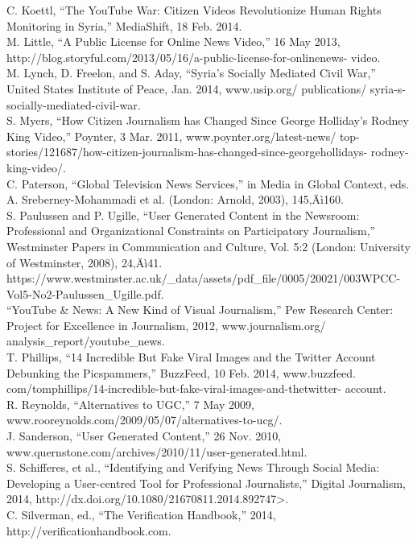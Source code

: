 C. Koettl, ``The YouTube War: Citizen Videos Revolutionize Human Rights
Monitoring in Syria,'' MediaShift, 18 Feb. 2014.\\
M. Little, ``A Public License for Online News Video,'' 16 May 2013,
http://blog.storyful.com/2013/05/16/a-public-license-for-onlinenews-
video.\\
M. Lynch, D. Freelon, and S. Aday, ``Syria's Socially Mediated Civil War,''
United States Institute of Peace, Jan. 2014, www.usip.org/ publications/
syria-s-socially-mediated-civil-war.\\
S. Myers, ``How Citizen Journalism has Changed Since George Holliday's
Rodney King Video,'' Poynter, 3 Mar. 2011, www.poynter.org/latest-news/
top-stories/121687/how-citizen-journalism-has-changed-since-georgehollidays-
rodney-king-video/.\\
C. Paterson, ``Global Television News Services,'' in Media in Global
Context, eds. A. Sreberney-Mohammadi et al. (London: Arnold, 2003),
145‚Äì160.\\
S. Paulussen and P. Ugille, ``User Generated Content in the Newsroom:
Professional and Organizational Constraints on Participatory Journalism,''
Westminster Papers in Communication and Culture, Vol. 5:2 (London:
University of Westminster, 2008), 24‚Äì41. https://www.westminster.ac.uk/_data/assets/pdf_file/0005/20021/003WPCC-Vol5-No2-Paulussen_Ugille.pdf.\\
``YouTube & News: A New Kind of Visual Journalism,'' Pew Research
Center: Project for Excellence in Journalism, 2012, www.journalism.org/
analysis_report/youtube_news.\\
T. Phillips, ``14 Incredible But Fake Viral Images and the Twitter Account
Debunking the Picspammers,'' BuzzFeed, 10 Feb. 2014, www.buzzfeed.
com/tomphillips/14-incredible-but-fake-viral-images-and-thetwitter-
account.\\
R. Reynolds, ``Alternatives to UGC,'' 7 May 2009,
www.rooreynolds.com/2009/05/07/alternatives-to-ucg/.\\
J. Sanderson, ``User Generated Content,'' 26 Nov. 2010,
www.quernstone.com/archives/2010/11/user-generated.html.\\
S. Schifferes, et al., ``Identifying and Verifying News Through Social Media:
Developing a User-centred Tool for Professional Journalists,'' Digital
Journalism, 2014, http://dx.doi.org/10.1080/21670811.2014.892747>.\\
C. Silverman, ed., ``The Verification Handbook,'' 2014,
http://verificationhandbook.com.\\
